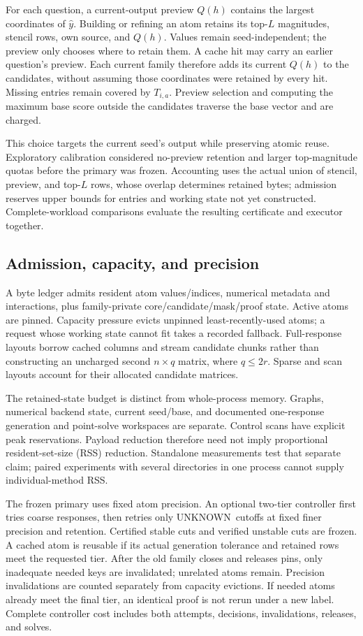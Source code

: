\documentclass[conference]{IEEEtran}
\newcommand{\unknown}{\textsf{UNKNOWN}}
\begin{document}
For each question, a current-output preview $Q(h)$ contains the largest coordinates of $\widehat y$. Building or refining an atom retains its top-$L$ magnitudes, stencil rows, own source, and $Q(h)$. Values remain seed-independent; the preview only chooses where to retain them. A cache hit may carry an earlier question's preview. Each current family therefore adds its current $Q(h)$ to the candidates, without assuming those coordinates were retained by every hit. Missing entries remain covered by $T_{i,a}$. Preview selection and computing the maximum base score outside the candidates traverse the base vector and are charged.

This choice targets the current seed's output while preserving atomic reuse. Exploratory calibration considered no-preview retention and larger top-magnitude quotas before the primary was frozen. Accounting uses the actual union of stencil, preview, and top-$L$ rows, whose overlap determines retained bytes; admission reserves upper bounds for entries and working state not yet constructed. Complete-workload comparisons evaluate the resulting certificate and executor together.

\subsection{Admission, capacity, and precision}
A byte ledger admits resident atom values/indices, numerical metadata and interactions, plus family-private core/candidate/mask/proof state. Active atoms are pinned. Capacity pressure evicts unpinned least-recently-used atoms; a request whose working state cannot fit takes a recorded fallback. Full-response layouts borrow cached columns and stream candidate chunks rather than constructing an uncharged second $n\times q$ matrix, where $q\leq2r$. Sparse and scan layouts account for their allocated candidate matrices.

The retained-state budget is distinct from whole-process memory. Graphs, numerical backend state, current seed/base, and documented one-response generation and point-solve workspaces are separate. Control scans have explicit peak reservations. Payload reduction therefore need not imply proportional resident-set-size (RSS) reduction. Standalone measurements test that separate claim; paired experiments with several directories in one process cannot supply individual-method RSS.

The frozen primary uses fixed atom precision. An optional two-tier controller first tries coarse responses, then retries only \unknown\ cutoffs at fixed finer precision and retention. Certified stable cuts and verified unstable cuts are frozen. A cached atom is reusable if its actual generation tolerance and retained rows meet the requested tier. After the old family closes and releases pins, only inadequate needed keys are invalidated; unrelated atoms remain. Precision invalidations are counted separately from capacity evictions. If needed atoms already meet the final tier, an identical proof is not rerun under a new label. Complete controller cost includes both attempts, decisions, invalidations, releases, and solves.
\end{document}
